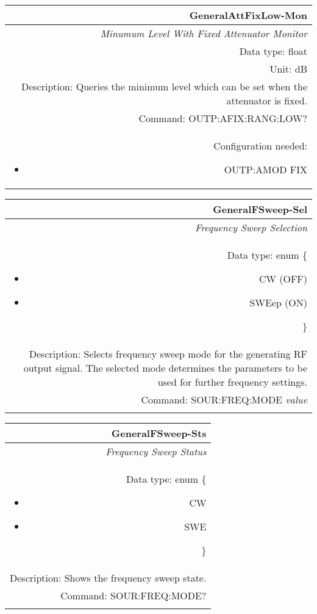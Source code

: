 \documentclass[openany]{article}
\begin{document}
		\begin{tabular}{N}
			\hline
			\bfseries GeneralAttFixLow-Mon \\ \hline
			\emph{Minumum Level With Fixed Attenuator Monitor} \\
			Data type: float \\
			Unit: dB \\
			Description: Queries the minimum level which can be set when the attenuator is fixed. \\
			Command: OUTP:AFIX:RANG:LOW? \\
			Configuration needed: \begin{itemize}[noitemsep]
				\small
				\item[] OUTP:AMOD FIX
			\end{itemize} \\

		\end{tabular}


		\begin{tabular}{N}
			\hline
			\bfseries GeneralFSweep-Sel \\ \hline
			\emph{Frequency Sweep Selection} \\
			Data type: enum \{\begin{itemize}[noitemsep]
				\small
				\item[] CW (OFF)
				\item[] SWEep (ON)
			\end{itemize}\} \\
			Description: Selects frequency sweep mode for the generating RF output signal. The selected mode determines the parameters to be used for further frequency settings. \\
			Command: SOUR:FREQ:MODE \emph{value} \\
			\\

		\end{tabular}


		\begin{tabular}{N}
			\hline
			\bfseries GeneralFSweep-Sts \\ \hline
			\emph{Frequency Sweep Status} \\
			Data type: enum \{\begin{itemize}[noitemsep]
				\small
				\item[] CW
				\item[] SWE
			\end{itemize}\} \\
			Description: Shows the frequency sweep state. \\
			Command: SOUR:FREQ:MODE? \\
			\\

		\end{tabular}
\end{document}
